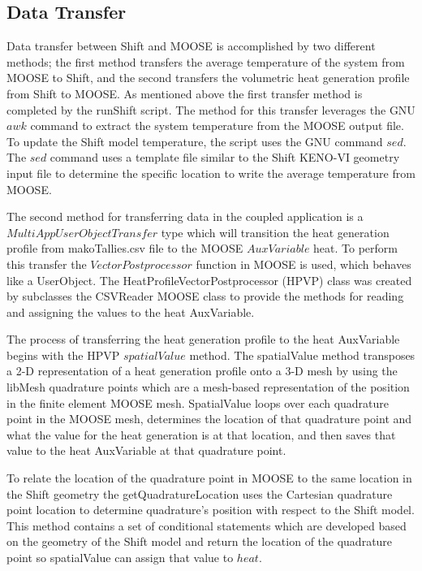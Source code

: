 \documentclass{anstrans}
\begin{document}
\subsection{Data Transfer}
Data transfer between Shift and MOOSE is accomplished by two different methods; the first method transfers the average temperature of the system from MOOSE to Shift, and the second transfers the volumetric heat generation profile from Shift to MOOSE. As mentioned above the first transfer method is completed by the runShift script. The method for this transfer leverages the GNU $awk$ command to extract the system temperature from the MOOSE output file. To update the Shift model temperature, the script uses the GNU command $sed$. The $sed$ command uses a template file similar to the Shift KENO-VI geometry input file to determine the specific location to write the average temperature from MOOSE.  

The second method for transferring data in the coupled application is a $MultiAppUserObjectTransfer$ type which will transition the heat generation profile from makoTallies.csv file to the MOOSE $AuxVariable$ heat. To perform this transfer the $VectorPostprocessor$ function in MOOSE is used, which behaves like a UserObject. The HeatProfileVectorPostprocessor (HPVP) class was created by subclasses the CSVReader MOOSE class to provide the methods for reading and assigning the values to the heat AuxVariable. 

The process of transferring the heat generation profile to the heat AuxVariable begins with the HPVP $spatialValue$ method. The spatialValue method transposes a 2-D representation of a heat generation profile onto a 3-D mesh by using the libMesh quadrature points which are a mesh-based representation of the position in the finite element MOOSE mesh. SpatialValue loops over each quadrature point in the MOOSE mesh, determines the location of that quadrature point and what the value for the heat generation is at that location, and then saves that value to the heat AuxVariable at that quadrature point. 

To relate the location of the quadrature point in MOOSE to the same location in the Shift geometry the getQuadratureLocation uses the Cartesian quadrature point location to determine quadrature's position with respect to the Shift model. This method contains a set of conditional statements which are developed based on the geometry of the Shift model and return the location of the quadrature point so spatialValue can assign that value to $heat$. 
\end{document}
